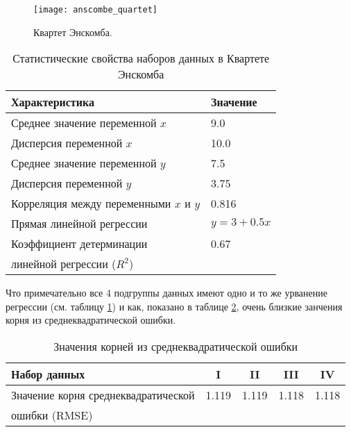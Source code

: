     \begin{figure}[!htp]
        \centering
        \texttt{[image: anscombe\_quartet]}
        \caption{Квартет Энскомба.}
        \label{pic:anscombe_quartet}
    \end{figure}

    \begin{table}[!htp]
    	\centering
    	\caption{Статистические свойства наборов данных в Квартете Энскомба}
		\begin{tabular}{|l|l|}
			\hline
			Характеристика                         & Значение   \\ \hline
			Среднее значение переменной $x$        & 9.0        \\ \hline
			Дисперсия переменной $x$               & 10.0       \\ \hline
			Среднее значение переменной $y$        & 7.5        \\ \hline
			Дисперсия переменной $y$               & 3.75       \\ \hline
			Корреляция между переменными $x$ и $y$ & 0.816      \\ \hline
			Прямая линейной регрессии              & $y=3+0.5x$ \\ \hline
			Коэффициент детерминации               & 0.67       \\
			линейной регрессии ($R^2$)             &            \\ \hline
		\end{tabular}
		\label{table:anscombe_quartet_statistics}
	\end{table}

	Что примечательно все 4 подгруппы данных имеют одно и то же урванение регрессии
	(см. таблицу \ref{table:anscombe_quartet_statistics}) и как, показано в
	таблице \ref{table:anscombe_quartet_rmse}, очень близкие занчения корня из
	среднеквадратической ошибки.

	\begin{table}[!htp]
    	\centering
    	\caption{Значения корней из среднеквадратической ошибки}
		\begin{tabular}{|l|c|c|c|c|}
			\hline
			Набор данных                        & I     & II    & III   & IV    \\ \hline
			Значение корня среднеквадратической & 1.119 & 1.119 & 1.118 & 1.118 \\ 
			ошибки (RMSE)                       &       &       &       &       \\ \hline
		\end{tabular}
		\label{table:anscombe_quartet_rmse}
	\end{table}

